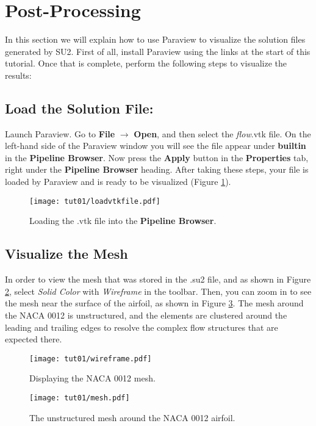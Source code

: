 \section{Post-Processing}
In this section we will explain how to use Paraview to visualize the solution files generated by SU2. First of all, install Paraview using the links at the start of this tutorial. Once that is complete, perform the following steps to visualize the results:
\subsection{Load the Solution File:}
Launch Paraview. Go to \textbf{File} $\rightarrow$ \textbf{Open}, and then select the \textit{flow}.vtk file. On the left-hand side of the Paraview window you will see the file appear under \textbf{builtin} in the \textbf{Pipeline Browser}. Now press the \textbf{Apply} button in the \textbf{Properties} tab, right under the \textbf{Pipeline Browser} heading. After taking these steps, your file is loaded by Paraview and is ready to be visualized (Figure \ref{fig1:load}).
\begin{figure}[htbp]
    \centering
    \texttt{[image: tut01/loadvtkfile.pdf]}
    \caption{Loading the .vtk file into the \textbf{Pipeline Browser}.}
    \label{fig1:load}
\end{figure}
\subsection{Visualize the Mesh}
In order to view the mesh that was stored in the .su2 file, and as shown in Figure \ref{fig1:wireframe}, select \textit{Solid Color} with \textit{Wireframe} in the toolbar. Then, you can zoom in to see the mesh near the surface of the airfoil, as shown in Figure \ref{fig1:mesh}. The mesh around the NACA 0012 is unstructured, and the elements are clustered around the leading and trailing edges to resolve the complex flow structures that are expected there.
\begin{figure}[htbp]
    \centering
    \texttt{[image: tut01/wireframe.pdf]}
    \caption{Displaying the NACA 0012 mesh.}
    \label{fig1:wireframe}
\end{figure}
\begin{figure}[htbp]
    \centering
    \texttt{[image: tut01/mesh.pdf]}
    \caption{The unstructured mesh around the NACA 0012 airfoil.}
    \label{fig1:mesh}
\end{figure}
